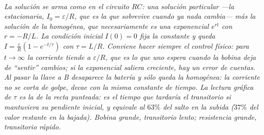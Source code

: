\begin{center}
\begin{tikzpicture}[scale=1]
\end{tikzpicture}\\[0.5em]
{\small\itshape La solución se arma como en el circuito $RC$: una solución
particular ---la estacionaria, $I_0 = \varepsilon/R$, que es la que sobrevive
cuando ya nada cambia--- más la solución de la homogénea, que necesariamente es
una exponencial $e^{rt}$ con $r = -R/L$. La condición inicial $I(0)=0$ fija la
constante y queda $I = \frac{\varepsilon}{R}(1-e^{-t/\tau})$ con
$\tau = L/R$. Conviene hacer siempre el control físico: para $t\to\infty$ la
corriente tiende a $\varepsilon/R$, que es lo que uno espera cuando la bobina
deja de ``sentir'' cambios; si la exponencial saliera creciente, hay un error de
cuentas. Al pasar la llave a B desaparece la batería y sólo queda la homogénea:
la corriente no se corta de golpe, decae con la \emph{misma} constante de
tiempo. La lectura gráfica de $\tau$ es la de la recta punteada: es el tiempo
que tardaría el transitorio si mantuviera su pendiente inicial, y equivale al
$63\%$ del salto en la subida ($37\%$ del valor restante en la bajada). Bobina
grande, transitorio lento; resistencia grande, transitorio rápido.}
\end{center}
